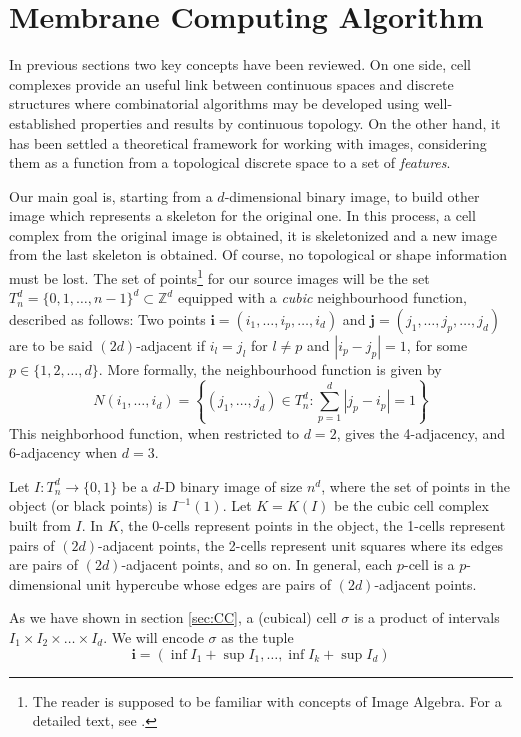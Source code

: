 \documentclass[journal]{IEEEtran}
\begin{document}
\section{Membrane Computing Algorithm}\label{sec:MCA}
In previous sections two key concepts have been reviewed. On one side, cell
complexes provide an useful link between continuous spaces and discrete
structures where combinatorial algorithms may be developed using
well-established properties and results by continuous topology. On the other
hand, it has been settled a theoretical framework for working with images,
considering them as a function from a topological discrete space to a set of
{\it features}.

Our main goal is, starting from a $d$-dimensional binary image, to build other
image which represents a skeleton for the original one. In this process, a cell
complex from the original image is obtained, it is skeletonized and a new image
from the last skeleton is obtained. Of course, no topological or shape
information must be lost. The set of points\footnote{The reader is supposed to
be familiar with concepts of Image Algebra. For a detailed text, see
\cite{DBLP:journals/cvgip/RitterWD90}.} for our source images
will be the set $T_n^d = \{0,1,\ldots, n-1\}^d \subset \mathbb{Z}^d$ equipped
with a \emph{cubic} neighbourhood function, described as follows: Two points
$\mathbf{i}=(i_1, \ldots, i_p, \ldots, i_d)$ and $\mathbf{j}=(j_1, \ldots, j_p,
\ldots, j_d)$ are to be said $(2d)$-adjacent if $i_l=j_l$ for $l \neq p$ and $|i_p
- j_p| = 1$, for some $p \in \{1, 2, \ldots, d\}$. More formally, the 
neighbourhood function is given by
$$
N(i_1,\ldots, i_d) = \left\{(j_1,\ldots, j_d) \in T_n^d: \sum_{p=1}^d |j_p-i_p| = 1 \right\}
$$ 
This neighborhood function, when restricted to $d=2$, gives the 4-adjacency,
and 6-adjacency when $d=3$.

Let $I:T_n^d \rightarrow \{0,1\}$ be a $d$-D binary image of size $n^d$, where
the set of points in the object (or black points) is $I^{-1}(1)$. Let $K = K(I)$
be the cubic cell complex built from $I$. In $K$, the 0-cells represent points
in the object, the 1-cells represent pairs of $(2d)$-adjacent points, the 2-cells
represent unit squares where its edges are pairs of $(2d)$-adjacent points, and so
on. In general, each $p$-cell is a $p$-dimensional unit hypercube whose edges
are pairs of $(2d)$-adjacent points.

As we have shown in section \ref{sec:CC}, a (cubical) cell $\sigma$ is a product of intervals
$I_1 \times I_2 \times \ldots \times I_d$. We will encode $\sigma$ as the tuple 
$$
\mathbf{i} = (\inf I_1 + \sup I_1, \ldots, \inf I_k + \sup I_d)
$$
\end{document}
